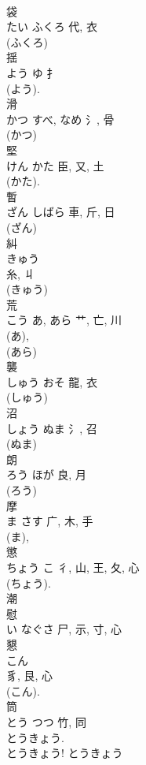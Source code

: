 \documentclass[8pt]{extreport}
\begin{document}
\begin{CJK}{UTF8}{min}
\\	袋	
\\	たい	ふくろ	代, 衣	
\\	(ふくろ) 
\\	揺	
\\	よう	ゆ	扌		
\\	(よう). 
\\	滑	
\\	かつ	すべ, なめ	氵, 骨	
\\	(かつ) 
\\	堅	
\\	けん	かた	臣, 又, 土	
\\	(かた). 
\\	暫	
\\	ざん	しばら	車, 斤, 日	
\\	(ざん) 
\\	糾	
\\	きゅう	
\\	糸, 丩	
\\	(きゅう) 
\\	荒	
\\	こう	あ, あら	艹, 亡, 川	
\\	(あ), 
\\	(あら) 
\\	襲	
\\	しゅう	おそ	龍, 衣	
\\	(しゅう) 
\\	沼	
\\	しょう	ぬま	氵, 召	
\\	(ぬま) 
\\	朗	
\\	ろう	ほが	良, 月	
\\	(ろう) 
\\	摩	
\\	ま	さす	广, 木, 手	
\\	(ま), 
\\	懲	
\\	ちょう	こ	彳, 山, 王, 夂, 心	
\\	(ちょう).	
\\	潮 
\\	慰	
\\	い	なぐさ	尸, 示, 寸, 心	
\\	懇	
\\	こん	
\\	豸, 艮, 心	
\\	(こん). 
\\	筒	
\\	とう	つつ	竹, 同	
\\	とうきょう. 
\\	とうきょう!	とうきょう 

\end{CJK}
\end{document}
